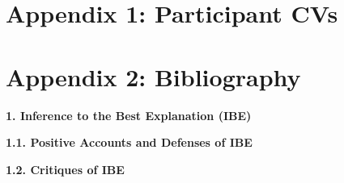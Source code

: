\documentclass{article}[11pt]
\begin{document}
\section{Appendix 1: Participant CVs}





\singlespacing

\section{Appendix 2: Bibliography}

\nocite{Douven1999,Harman1986a,Lipton2004,Lycan1988,Quine1970,Thagard1978,Thagard1992a,Thagard1999,Okasha2000,Poston2014,Psillos2009,Weisberg2009,Day1994,Fumerton1980,Salmon2001,Fraassen1989,Achinstein2001,Finetti1972,Earman1992a,Glymour1980,Howson1993,Kelly1996,Mayo1996,Norton2003,Norton2007,Ben-Menahem1990,Cartwright1983,Chakravartty2007,Hacking1983,Psillos1999,Stanford2006,Barnes1992,Bromberger1965,Gijsbers2007,Hempel1965,Friedman1974,Kitcher1989,Schurz1994,Morrison1999,Bechtel1993,Cartwright2007,Craver2007,Hall2004,Lewis1986,Reiss2015,Salmon1984,Strevens2008,Woodward2003,Baker2005,Batterman2002,Bokulich2011,Huneman2010,Lange2016,Risjord2005,Achinstein1983,Faye2007,Kitcher1987,Risjord2000,Fraassen1980,Sintonen1984,Boyd1983,Fine1986a,Kitcher2001,Ladyman2007,Laudan1981,Worrall1989,Chakravarttyforthcoming,Christensen2007,Elga2007,Kelly2005,Monton2007,Schoenfield2013,Fraassen1984,Fraassen2002,White2005a,Brandom1994,Brandom2008,Brandom2015,Peregrin2014,Hlobil2016,Kukla2009,Lange2000,Lange2009b,Millson2014,Millson2014a,Price2013,Rouse2002,Rouse2015,Sellars1963,Piazza2015,Piazza2016,DAgostino2015}

\vspace{3mm}
\textbf{{\large 1. Inference to the Best Explanation} (IBE)}\vspace{3mm}

\textbf{1.1. Positive Accounts and Defenses of IBE}

\printbibliography[keyword=IBE defense]

\textbf{1.2. Critiques of IBE}

\printbibliography[keyword=IBE_critique]
\end{document}
